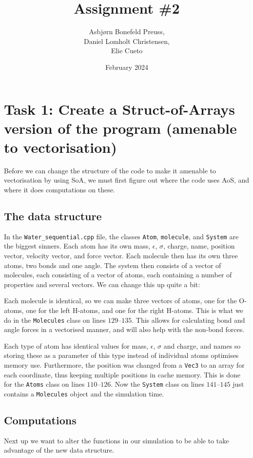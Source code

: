 \documentclass{article}
\title{Assignment \#2}
\author{Asbjørn Bonefeld Preuss,\\ Daniel Lomholt Christensen,\\ Elie Cueto}
\date{February 2024}
\begin{document}
\maketitle
\section{Task 1: Create a Struct-of-Arrays version of the program (amenable to
vectorisation)}
Before we can change the structure of the code to make it amenable to vectorisation by using SoA, we must first figure out where the code uses AoS, and where it does computations on these.

\subsection{The data structure}
In the \texttt{Water\_sequential.cpp} file, the classes \texttt{Atom}, \texttt{molecule}, and \texttt{System} are the biggest sinners. Each atom has its own mass, $\epsilon$, $\sigma$, charge, name, position vector, velocity vector, and force vector. Each molecule then has its own three atoms, two bonds and one angle. The system then consists of a vector of molecules, each consisting of a vector of atoms, each containing a number of properties and several vectors. We can change this up quite a bit: 

Each molecule is identical, so we can make three vectors of atoms, one for the O-atoms, one for the left H-atoms, and one for the right H-atoms. This is what we do in the \texttt{Molecules} class on lines $129$--$135$. This allows for calculating bond and angle forces in a vectorised manner, and will also help with the non-bond forces.

Each type of atom has identical values for mass, $\epsilon$, $\sigma$ and charge, and names so storing these as a parameter of this type instead of individual atoms optimises memory use. Furthermore, the position was changed from a \texttt{Vec3} to an array for each coordinate, thus keeping multiple positions in cache memory. This is done for the \texttt{Atoms} class on lines $110$--$126$. Now the \texttt{System} class on lines $141$--$145$ just contains a \texttt{Molecules} object and the simulation time.

\subsection{Computations}
Next up we want to alter the functions in our simulation to be able to take advantage of the new data structure. 
\end{document}
